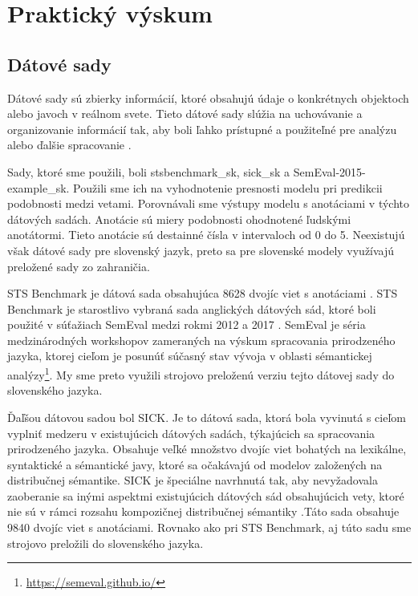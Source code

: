\section{Praktický výskum}
\subsection{Dátové sady}
\label{kap:dataset}
Dátové sady sú zbierky informácií, ktoré obsahujú údaje o konkrétnych objektoch alebo javoch v reálnom svete. Tieto dátové sady slúžia na uchovávanie a organizovanie informácií tak, aby boli ľahko prístupné a použiteľné pre analýzu alebo ďalšie spracovanie \cite{dataset}. 
\vspace{1em}

\noindent
Sady, ktoré sme použili, boli stsbenchmark\_sk, sick\_sk a SemEval-2015-example\_sk. Použili sme ich na vyhodnotenie presnosti modelu pri predikcii podobnosti medzi vetami. Porovnávali sme výstupy modelu s anotáciami v týchto dátových sadách. Anotácie sú miery podobnosti ohodnotené ľudskými anotátormi. Tieto anotácie sú destainné čísla v intervaloch od 0 do 5. Neexistujú však dátové sady pre slovenský jazyk, preto sa pre slovenské modely využívajú preložené sady zo zahraničia. 
\label{kap:bench}
\vspace{1em}

\noindent
STS Benchmark je dátová sada obsahujúca 8628 dvojíc viet s anotáciami \cite{stsbenchmark1}. STS Benchmark je starostlivo vybraná sada anglických dátových sád, ktoré boli použité v súťažiach SemEval medzi rokmi 2012 a 2017 \cite{stsbenchmark2}. SemEval je séria medzinárodných workshopov zameraných na výskum spracovania prirodzeného jazyka, ktorej cieľom je posunúť súčasný stav vývoja v oblasti sémantickej analýzy\footnote{\url{https://semeval.github.io/}}. My sme preto využili strojovo preloženú verziu tejto dátovej sady do slovenského jazyka.
\vspace{1em}

\noindent
Ďaľšou dátovou sadou bol SICK. Je to dátová sada, ktorá bola vyvinutá s cieľom vyplniť medzeru v existujúcich dátových sadách, týkajúcich sa spracovania prirodzeného jazyka. Obsahuje veľké množstvo dvojíc viet bohatých na lexikálne, syntaktické a sémantické javy, ktoré sa očakávajú od modelov založených na distribučnej sémantike. SICK je špeciálne navrhnutá tak, aby nevyžadovala zaoberanie sa inými aspektmi existujúcich dátových sád obsahujúcich vety, ktoré nie sú v rámci rozsahu kompozičnej distribučnej sémantiky \cite{sick}.Táto sada obsahuje 9840 dvojíc viet s anotáciami. Rovnako ako pri STS Benchmark, aj túto sadu sme strojovo preložili do slovenského jazyka.
\vspace{1em}

